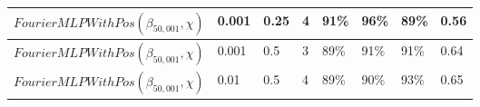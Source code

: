 \documentclass[10pt]{article}
\begin{document}
\begin{minipage}{\textwidth}
\begin{center}
\begin{tabular}{|l|l|l|l|l|l|l|l|}
            \hline
            $FourierMLPWithPos(\beta_{50,001}, \chi)$ & 0.001 & 0.25 & 4 & 91\% & 96\% & 89\% & 0.56 \\
            \hline
            $FourierMLPWithPos(\beta_{50,001}, \chi)$ & 0.001 & 0.5 & 3 & 89\% & 91\% & 91\% & 0.64 \\
            \hline
            $FourierMLPWithPos(\beta_{50,001}, \chi)$ & 0.01 & 0.5 & 4 & 89\% & 90\% & 93\% & 0.65 \\
            \hline
        \end{tabular}
    \end{center}
\end{minipage}
\end{document}
